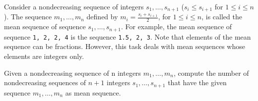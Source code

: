 Consider a nondecreasing sequence of integers $s_1, \ldots, s_{n+1}$ ($s_i \le s_{i + 1}$ for $1 \le i \le n$). The sequence $m_1, \ldots, m_n$
defined by $m_i = \frac{s_i + s_{i + 1}}{2}$, for $1 \le i \le n$, is called the mean sequence of sequence $s_1, \ldots, s_{n + 1}$. For example,
the mean sequence of sequence \texttt{1, 2, 2, 4} is the sequence \texttt{1.5, 2, 3}. Note that elements of the mean sequence
can be fractions. However, this task deals with mean sequences whose elements are integers only.

Given a nondecreasing sequence of n integers $m_1, \ldots, m_n$, compute the number of nondecreasing sequences of $n + 1$ integers $s_1, \ldots, s_{n + 1}$ that have the given sequence $m_1, \ldots, m_n$ as mean sequence.

